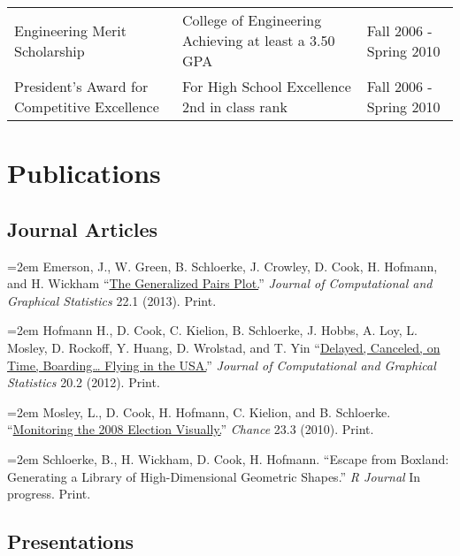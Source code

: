\documentclass[oneside]{article}
\begin{document}
\begin{tabular}{p{7cm}p{7cm}p{1.9cm}}
Engineering Merit Scholarship&
College of Engineering \newline Achieving at least a 3.50 GPA&
Fall 2006 - \newline Spring 2010\\[0.5em]

President's Award for Competitive Excellence &
For High School Excellence \newline 2nd in class rank &
Fall 2006 - \newline Spring 2010\\[0.5em]
\end{tabular}

\newpage
\section{Publications}

  \subsection{Journal Articles}


    \hangindent=2em
    Emerson, J., W. Green, B. Schloerke, J. Crowley, D. Cook, H. Hofmann, and H. Wickham ``\href{http://vita.had.co.nz/papers/gpp.pdf}{The Generalized Pairs Plot.}'' \emph{Journal of Computational and Graphical Statistics} 22.1 (2013). Print.

    \hangindent=2em
    Hofmann H., D. Cook, C. Kielion, B. Schloerke, J. Hobbs, A. Loy, L. Mosley, D. Rockoff, Y. Huang, D. Wrolstad, and T. Yin ``\href{http://amstat.tandfonline.com/doi/abs/10.1198/jcgs.2011.3de}{Delayed, Canceled, on Time, Boarding… Flying in the USA.}'' \emph{Journal of Computational and Graphical Statistics} 20.2 (2012). Print.

    \hangindent=2em
    Mosley, L., D. Cook, H. Hofmann, C. Kielion, and B. Schloerke. ``\href{http://chance.amstat.org/files/2010/12/Visually.pdf}{Monitoring the 2008 Election Visually.}'' \emph{Chance} 23.3 (2010). Print.

    \hangindent=2em
    Schloerke, B., H. Wickham, D. Cook, H. Hofmann. ``Escape from Boxland: Generating a Library of High-Dimensional Geometric Shapes.'' \emph{R Journal} In progress. Print.


  \subsection{Presentations}
\end{document}
